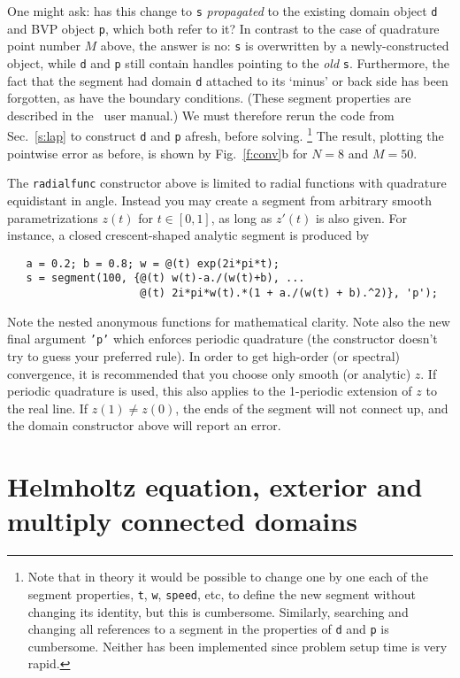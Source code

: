 \documentclass[11pt]{article}
\begin{document}
One might ask: has this change to {\tt s} {\em propagated}
to the existing domain
object {\tt d} and BVP object {\tt p}, which both refer to it?
In contrast to the case of quadrature point number $M$ above,
the answer is no:
{\tt s} is overwritten by a newly-constructed object, while
{\tt d} and {\tt p} still contain handles pointing to the {\em old}
{\tt s}.
Furthermore, the fact that the segment had domain {\tt d}
attached to its `minus' or back side has been forgotten, as have the
boundary conditions.
(These segment properties are described in the \mpspack\ user manual.)
We must therefore rerun the code from Sec.~\ref{s:lap}
to construct {\tt d} and {\tt p} afresh, before solving.%
  \footnote{Note that in theory it would be possible to
    change one by one each of the segment properties, {\tt t}, {\tt w},
    {\tt speed}, etc, to define the new segment without changing its identity,
    but this is cumbersome. Similarly, searching and changing
    all references to a segment in the properties of {\tt d} and {\tt p}
    is cumbersome. Neither has been implemented since problem setup time is
    very rapid.}
The result, plotting the pointwise error as before,
is shown by Fig.~\ref{f:conv}b for $N=8$ and $M=50$.

The {\tt radialfunc} constructor above is limited to radial functions
with quadrature equidistant
in angle. Instead you may create a segment from arbitrary
smooth parametrizations $z(t)$ for $t \in[0,1]$, as long as $z'(t)$
is also given. For instance, a closed crescent-shaped analytic segment is
produced by 
\begin{verbatim}
   a = 0.2; b = 0.8; w = @(t) exp(2i*pi*t);
   s = segment(100, {@(t) w(t)-a./(w(t)+b), ...
                     @(t) 2i*pi*w(t).*(1 + a./(w(t) + b).^2)}, 'p');
\end{verbatim}
Note the nested anonymous functions for mathematical clarity.
Note also the new final argument {\tt 'p'} which enforces
periodic quadrature (the constructor doesn't try to guess your preferred rule).
In order to get high-order (or spectral) convergence, it is recommended
that you choose only smooth (or analytic) $z$.
If periodic quadrature is used,
this also applies to the 1-periodic extension of $z$ to the real line.
If $z(1)\neq z(0)$, the ends of the segment will not connect
up, and the domain constructor above will report an error.


\section{Helmholtz equation, exterior and multiply connected domains}
\end{document}
